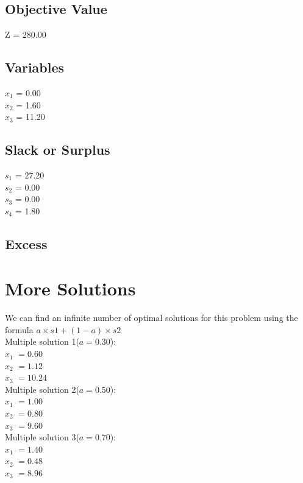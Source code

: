 \documentclass[12pt,a4paper]{article}
\begin{document}
\subsection*{Objective Value}
Z = 280.00

\subsection*{Variables}
$x_1$ = 0.00 \\
$x_2$ = 1.60 \\
$x_3$ = 11.20 \\

\subsection*{Slack or Surplus}
$s_1$ = 27.20 \\
$s_2$ = 0.00 \\
$s_3$ = 0.00 \\
$s_4$ = 1.80 \\

\subsection*{Excess}
\newpage
\section*{More Solutions}
We can find an infinite number of optimal solutions for this problem using the formula $a \times s1 + (1 - a) \times s2$ \\
Multiple solution 1($a = 0.30$): \\
$x_1$ $= 0.60$ \\
$x_2$ $= 1.12$ \\
$x_3$ $= 10.24$ \\
Multiple solution 2($a = 0.50$): \\
$x_1$ $= 1.00$ \\
$x_2$ $= 0.80$ \\
$x_3$ $= 9.60$ \\
Multiple solution 3($a = 0.70$): \\
$x_1$ $= 1.40$ \\
$x_2$ $= 0.48$ \\
$x_3$ $= 8.96$ \\
\end{document}
